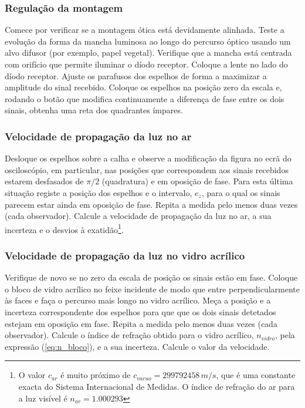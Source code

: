 \documentclass[a4paper,12pt]{article}      %
\begin{document}
\subsubsection{\sf Regulação da montagem}
 
Comece por verificar se a montagem ótica está devidamente alinhada. Teste a evolução da forma da mancha 
luminosa ao longo do percurso óptico usando um alvo difusor (por exemplo, papel vegetal). 
Verifique que a mancha está centrada com  orifício que permite iluminar o 
díodo receptor. Coloque a lente no lado do díodo receptor.
Ajuste os parafusos dos espelhos de forma a maximizar a amplitude do sinal 
recebido.
Coloque os espelhos na posição zero da escala e, rodando o botão que modifica 
continuamente a diferença de fase entre os dois sinais, obtenha uma reta dos quadrantes ímpares. 

\subsubsection{\sf Velocidade de propagação da luz no ar}
Desloque os espelhos sobre a calha e observe a modificação da figura no ecrã do 
osciloscópio, em particular, nas posições que correspondem aos sinais recebidos estarem 
desfasados de $\pi/2$ (quadratura) e em oposição de fase. Para esta última situação registe a 
posição dos espelhos e o intervalo, $e_z$,  para o qual os sinais parecem estar ainda em 
oposição de fase. Repita a medida pelo menos duas vezes (cada observador). 
Calcule a velocidade de propagação da luz no ar, a sua incerteza e o desvios à exatidão\footnote{O valor $c_{ar}$ é muito próximo de $c_{vacuo} = 299 792 458\,m/s$, que é uma constante exacta do Sistema Internacional de Medidas. O índice de refração do ar para a luz visível é $n_{ar}=1.000293$}. 

\subsubsection{\sf Velocidade de propagação da luz no vidro acrílico}
Verifique de novo se no zero da escala de posição os sinais estão em fase. Coloque o bloco de vidro 
acrílico no feixe incidente de modo que entre perpendicularmente às faces e faça o percurso 
mais longo no vidro acrílico. Meça a posição e a incerteza correspondente dos espelhos para que 
que os dois sinais detetados estejam em oposição em fase. Repita a medida pelo menos 
duas vezes (cada observador).
Calcule o índice de refração obtido para o vidro acrílico, $n_{vidro}$, pela expressão (\ref{eq:n_bloco}),  e a sua incerteza. Calcule o valor da velocidade.
\end{document}
